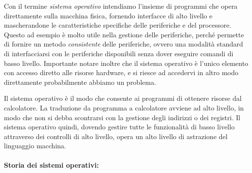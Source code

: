 \documentclass[
  paper=a4,
  oneside  ,captions=tableheading
]{scrbook}
\begin{document}
Con il termine \emph{sistema operativo} intendiamo l'insieme di
programmi che opera direttamente sulla macchina fisica, fornendo
interfacce di alto livello e mascherandone le caratteristiche specifiche
delle periferiche e del processore. Questo ad esempio è molto utile
nella gestione delle periferiche, perché permette di fornire un metodo
\emph{consistente} delle periferiche, ovvero una modalità standard di
interfacciarsi con le periferiche disponibili senza dover eseguire
comandi di basso livello. Importante notare inoltre che il sistema
operativo è l'unico elemento con accesso diretto alle risorse hardware,
e si riesce ad accedervi in altro modo direttamente probabilmente
abbiamo un problema.

Il sistema operativo è il modo che consente ai programmi di ottenere
risorse dal calcolatore. La traduzione da programma a calcolatore
avviene ad alto livello, in modo che non si debba scontrarsi con la
gestione degli indirizzi o dei registri. Il sistema operativo quindi,
dovendo gestire tutte le funzionalità di basso livello attraverso dei
controlli di alto livello, opera un alto livello di astrazione del
linguaggio macchina.

\hypertarget{storia-dei-sistemi-operativi}{%
\paragraph{Storia dei sistemi
operativi:}\label{storia-dei-sistemi-operativi}}
\end{document}

